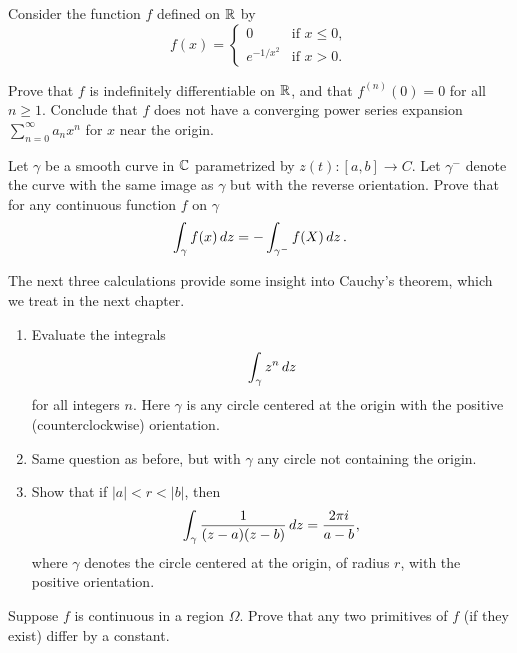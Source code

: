 \begin{exercise}
Consider the function $f$ defined on $\mathbb{R}$ by $$f(x)=\begin{cases} 0 & \text{if } x\leq 0, \\ e^{-1/x^2} & \text{if } x > 0. \end{cases}$$

Prove that $f$ is indefinitely differentiable on $\mathbb{R}$, and that $f^{(n)}
(0) = 0$ for all $n\geq 1$.
Conclude that $f$ does not have a converging power series expansion $\sum_{n=0}^\infty a_nx^n$ for $x$ near the origin.
\end{exercise}

\begin{exercise}
Let $\gamma$ be a smooth curve in $\mathbb{C}$ parametrized by $z(t):[a, b] \to C$. Let $\gamma^-$ denote the curve with the same image as $\gamma$ but with the reverse orientation. Prove that for any continuous function $f$ on $\gamma$ $$\int_\gamma f(x)\mathop{d{z}} = -\int_{\gamma^-} f(X)\mathop{d{z}}.$$
\end{exercise}

\begin{exercise}
The next three calculations provide some insight into Cauchy’s theorem, which we treat in the next chapter.

\begin{enumerate}[label=(\alph*)]
\item Evaluate the integrals $$\int_\gamma z^n\mathop{d{z}}$$ for all integers $n$. Here $\gamma$ is any circle centered at the origin with the positive (counterclockwise) orientation.
\item Same question as before, but with $\gamma$ any circle not containing the origin.
\item Show that if $|a|<r<|b|$, then $$\int_\gamma \frac{1}{(z-a)(z-b)}\mathop{d{z}} = \frac{2\pi i}{a-b},$$ where $\gamma$ denotes the circle centered at the origin, of radius $r$, with the positive orientation.
\end{enumerate}
\end{exercise}

\begin{exercise}
Suppose $f$ is continuous in a region $\Omega$. Prove that any two primitives of $f$ (if they exist) differ by a constant.
\end{exercise}

